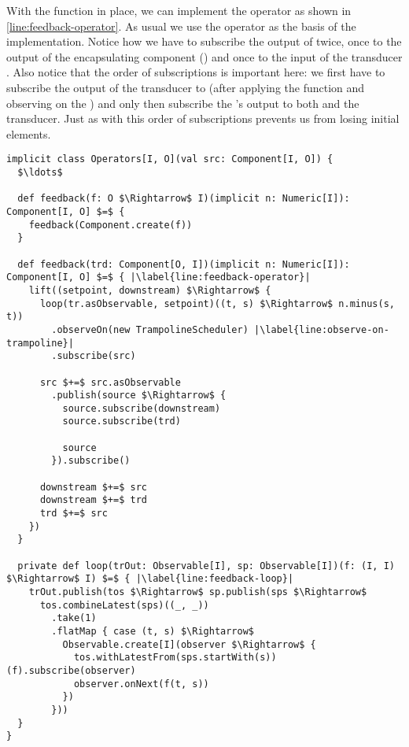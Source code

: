 With the  function in place, we can implement the  operator as shown in  \cref{line:feedback-operator}. As usual we use the  operator as the basis of the implementation. Notice how we have to subscribe the output of  twice, once to the output of the encapsulating component () and once to the input of the transducer . Also notice that the order of subscriptions is important here: we first have to subscribe the output of the transducer to  (after applying the  function and observing on the ) and only then subscribe the 's output to both  and the transducer. Just as with  this order of subscriptions prevents us from losing initial elements.

\begin{minipage}{\linewidth}
\begin{lstlisting}[style=ScalaStyle, caption={Feedback operator}, label={lst:feedback-operator}]
implicit class Operators[I, O](val src: Component[I, O]) {
  $\ldots$

  def feedback(f: O $\Rightarrow$ I)(implicit n: Numeric[I]): Component[I, O] $=$ {
    feedback(Component.create(f))
  }

  def feedback(trd: Component[O, I])(implicit n: Numeric[I]): Component[I, O] $=$ { |\label{line:feedback-operator}|
    lift((setpoint, downstream) $\Rightarrow$ {
      loop(tr.asObservable, setpoint)((t, s) $\Rightarrow$ n.minus(s, t))
        .observeOn(new TrampolineScheduler) |\label{line:observe-on-trampoline}|
        .subscribe(src)

      src $+=$ src.asObservable
        .publish(source $\Rightarrow$ {
          source.subscribe(downstream)
          source.subscribe(trd)

          source
        }).subscribe()

      downstream $+=$ src
      downstream $+=$ trd
      trd $+=$ src
    })
  }
  
  private def loop(trOut: Observable[I], sp: Observable[I])(f: (I, I) $\Rightarrow$ I) $=$ { |\label{line:feedback-loop}|
    trOut.publish(tos $\Rightarrow$ sp.publish(sps $\Rightarrow$
      tos.combineLatest(sps)((_, _))
        .take(1)
        .flatMap { case (t, s) $\Rightarrow$
          Observable.create[I](observer $\Rightarrow$ {
            tos.withLatestFrom(sps.startWith(s))(f).subscribe(observer)
            observer.onNext(f(t, s))
          })
        }))
  }
}
\end{lstlisting}
\end{minipage}

